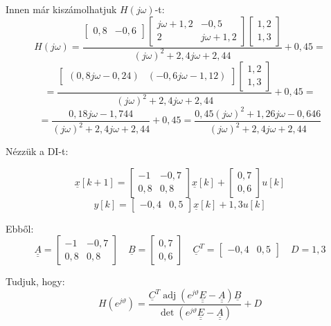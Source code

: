 \documentclass[12pt,a4paper]{article}
\newcommand\uuline[1]{\underline{\underline{#1}}}
\newcommand\uline[1]{\underline{#1}}
\DeclareMathOperator{\adj}{adj}
\begin{document}
Innen már kiszámolhatjuk $H(j \omega)$-t:
\[H(j \omega) = \frac{\left[\begin{matrix}0,8 & -0,6\end{matrix}\right] \left[\begin{matrix}j\omega+1,2 & -0,5\\2 & j\omega+1,2\end{matrix}\right]\left[\begin{matrix}1,2\\1,3\end{matrix}\right]}{(j\omega)^2+2,4j\omega+2,44} + 0,45 =\]
\[= \frac{\left[\begin{matrix}(0,8j\omega - 0,24) & (-0,6j\omega-1,12)\end{matrix}\right] \left[\begin{matrix}1,2\\1,3\end{matrix}\right]}{(j\omega)^2+2,4j\omega+2,44} + 0,45 = \]
\[= \frac{0,18j\omega-1,744}{(j\omega)^2+2,4j\omega+2,44} + 0,45 = \boxed{\frac{0,45(j\omega)^2 +1,26j\omega-0,646}{(j\omega)^2+2,4j\omega+2,44}} \]

Nézzük a DI-t:

\[\uline{x}[k+1] = \left[\begin{matrix}-1 & -0,7\\0,8 & 0,8\end{matrix}\right]\uline{x}[k] + \left[\begin{matrix}0,7\\0,6\end{matrix}\right]u[k]\]
\[y[k] = \left[\begin{matrix}-0,4 & 0,5\end{matrix}\right]\uline{x}[k] + 1,3u[k]\]

Ebből:
\[\uuline{A} = \left[\begin{matrix}-1 & -0,7\\0,8 & 0,8\end{matrix}\right] \quad \uline{B}=\left[\begin{matrix}0,7\\0,6\end{matrix}\right] \quad \uline{C}^T = \left[\begin{matrix}-0,4 & 0,5\end{matrix}\right] \quad D = 1,3\]

Tudjuk, hogy:
\[H(e^{j \vartheta}) = \frac{\uline{C}^T \adj(e^{j \vartheta} \uuline{E}-\uuline{A})\uline{B}}{\det(e^{j \vartheta} \uuline{E}-\uuline{A})} + D\]
\end{document}

